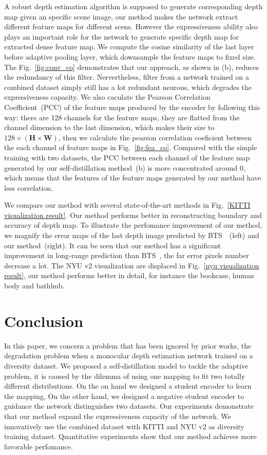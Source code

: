 \documentclass{svjour3}                     %
\begin{document}
A robust depth estimation algorithm is supposed to
generate corresponding depth map given an specific scene image, our method
makes the network extract different feature maps for different scens. However 
the expressiveness
ability also plays an important role 
for the network to generate specific depth map for extracted dense
feature map. We compute 
the cosine similarity of the last layer before adaptive
pooling layer, which downsample the feature maps to fixed
size. The Fig.~\ref{fig:conv_co}
demonstrates that our approach, as shown in (b), reduces the redundancy of
this 
filter. Nervertheless, filter from a network trained on a combined dataset
simply still
has a lot redundant neurous, which degrades the expressiveness capacity. We
also caculate the Pearson Correlation Coefficient~(PCC)
of the feature maps produced by the encoder by following this way: there
are 128 channels for the feature maps, they are 
flatted from the channel dimension to the last dimension,
which makes their size to $128\times \mathbf{(H\times W)}$, 
then we calculate the pearson correlation coeficient between the each channel 
of feature maps in Fig.~\ref{fig:fea_co}. Compared with the simple training with two datasets, the
PCC between each channel of the feature map generated by our
self-distillation method~(b) is more
concentrated around 0, which means that the features of the feature maps
generated by
our method have less correlation. 

We compare our method with several state-of-the-art methods in Fig.~\ref{KITTI visualization result}. Our method performs better in reconstructing boundary and
accuracy of depth map. To illustrate the perfomance improvement of our
method, we magnify the error maps of
the last depth image predicted by BTS~\cite{bts}~(left) and 
our method~(right). It can be seen that our method has a significant improvement in
long-range prediction than BTS~\cite{bts}, the far error pixels number decrease a 
lot. The NYU v2 visualization are displaced in Fig.~\ref{nyu visualization result},
 our method performs better in detail, for instance the bookcase, human body and 
 bathhub.




\section{Conclusion}
In this paper, we concern a problem that has been ignored by 
prior works, the degradation problem when a monocular depth estimation network
trained on a diversity dataset.
We proposed a self-distillation model to tackle the adaptive 
problem, it is caused by the dilemma of using one mapping to fit two totally
different distributions. On the on hand we 
designed a student encoder to learn the mapping, On the other hand, we designed a
negative student encoder to guidance the network 
distinguishes two datasets. Our experiments demonstrate that our 
method expand the expressiveness capacity of the network. We 
innovatively use the combined dataset with KITTI and NYU v2 as
diversity training dataset. Quantitative experiments show that 
our method achieves more favorable perfomance.
\end{document}
